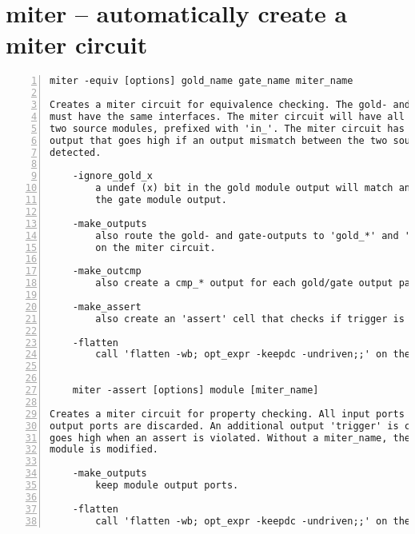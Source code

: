 \section{miter -- automatically create a miter circuit}
\label{cmd:miter}
\begin{lstlisting}[numbers=left,frame=single]
    miter -equiv [options] gold_name gate_name miter_name

Creates a miter circuit for equivalence checking. The gold- and gate- modules
must have the same interfaces. The miter circuit will have all inputs of the
two source modules, prefixed with 'in_'. The miter circuit has a 'trigger'
output that goes high if an output mismatch between the two source modules is
detected.

    -ignore_gold_x
        a undef (x) bit in the gold module output will match any value in
        the gate module output.

    -make_outputs
        also route the gold- and gate-outputs to 'gold_*' and 'gate_*' outputs
        on the miter circuit.

    -make_outcmp
        also create a cmp_* output for each gold/gate output pair.

    -make_assert
        also create an 'assert' cell that checks if trigger is always low.

    -flatten
        call 'flatten -wb; opt_expr -keepdc -undriven;;' on the miter circuit.


    miter -assert [options] module [miter_name]

Creates a miter circuit for property checking. All input ports are kept,
output ports are discarded. An additional output 'trigger' is created that
goes high when an assert is violated. Without a miter_name, the existing
module is modified.

    -make_outputs
        keep module output ports.

    -flatten
        call 'flatten -wb; opt_expr -keepdc -undriven;;' on the miter circuit.
\end{lstlisting}

